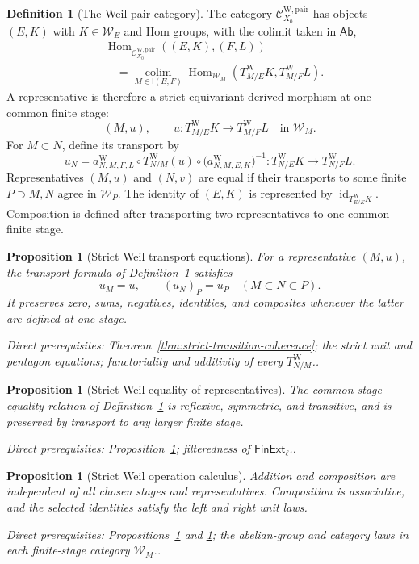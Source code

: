 \documentclass[10pt]{article}
\newtheorem{proposition}[theorem]{Proposition}
\theoremstyle{definition}
\newtheorem{definition}[theorem]{Definition}
\newcommand{\Hom}{\operatorname{Hom}}
\newcommand{\PairW}{\mathcal C_{X_0}^{\mathrm{W,pair}}}
\newcommand{\depends}[1]{\par\smallskip\noindent\textit{Direct prerequisites:} #1.}
\begin{document}
\begin{definition}[The Weil pair category]\label{def:weil-pair}
The category $\PairW$ has objects $(E,K)$ with $K\in\mathcal W_E$ and Hom
groups, with the colimit taken in $\mathsf{Ab}$,
\[
\begin{aligned}
 &\Hom_{\PairW}((E,K),(F,L))\\
 &\quad=
 \operatorname*{colim}_{M\in\mathsf I(E,F)}
 \Hom_{\mathcal W_M}
 (T^{\mathrm W}_{M/E}K,T^{\mathrm W}_{M/F}L).
\end{aligned}
\]
A representative is therefore a strict equivariant derived morphism at one
common finite stage:
\[
 (M,u),\qquad
 u:T^{\mathrm W}_{M/E}K\longrightarrow T^{\mathrm W}_{M/F}L
 \quad\text{in }\mathcal W_M.
\]
For $M\subset N$, define its transport by
\[
 u_N=
 a^{\mathrm W}_{N,M,F,L}\circ T^{\mathrm W}_{N/M}(u)\circ
 \bigl(a^{\mathrm W}_{N,M,E,K}\bigr)^{-1}:
 T^{\mathrm W}_{N/E}K\longrightarrow T^{\mathrm W}_{N/F}L.
\]
Representatives $(M,u)$ and $(N,v)$ are equal if their transports to some
finite $P\supset M,N$ agree in $\mathcal W_P$.  The identity of $(E,K)$ is
represented by
$\operatorname{id}_{T^{\mathrm W}_{E/E}K}$.  Composition is defined after
transporting two representatives to one common finite stage.
\end{definition}

\begin{proposition}[Strict Weil transport equations]
\label{prop:weil-transport}
For a representative $(M,u)$, the transport formula of
Definition~\ref{def:weil-pair} satisfies
\[
 u_M=u,
 \qquad
 (u_N)_P=u_P\quad(M\subset N\subset P).
\]
It preserves zero, sums, negatives, identities, and composites whenever
the latter are defined at one stage.
\depends{Theorem~\ref{thm:strict-transition-coherence}; the strict unit and
pentagon equations; functoriality and additivity of every
$T^{\mathrm W}_{N/M}$.}
\end{proposition}

\begin{proposition}[Strict Weil equality of representatives]
\label{prop:weil-representative-equality}
The common-stage equality relation of Definition~\ref{def:weil-pair} is
reflexive, symmetric, and transitive, and is preserved by transport to any
larger finite stage.
\depends{Proposition~\ref{prop:weil-transport}; filteredness of
$\mathsf{FinExt}_\ell$.}
\end{proposition}

\begin{proposition}[Strict Weil operation calculus]
\label{prop:weil-representatives}
Addition and composition are independent of all chosen stages and
representatives.  Composition is associative, and the selected identities
satisfy the left and right unit laws.
\depends{Propositions~\ref{prop:weil-transport} and
\ref{prop:weil-representative-equality}; the abelian-group and category laws
in each finite-stage category $\mathcal W_M$.}
\end{proposition}
\end{document}
